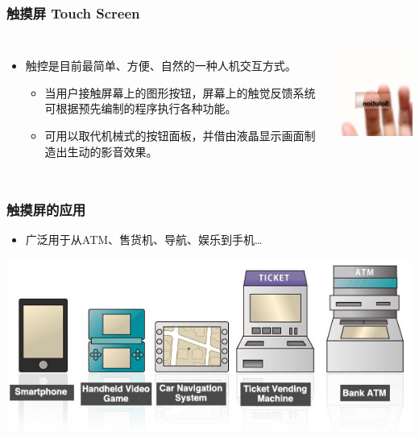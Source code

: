 \documentclass{beamer}
\begin{document}
\begin{frame}
	\frametitle{触摸屏 Touch Screen}
	\beamertemplatetransparentcovereddynamicmedium
	\begin{columns}
	\begin{itemize}[<+->]
		\item 触控是目前最简单、方便、自然的一种人机交互方式。
		\begin{itemize}
			\item 当用户接触屏幕上的图形按钮，屏幕上的触觉反馈系统可根据预先编制的程序执行各种功能。
			\item 可用以取代机械式的按钮面板，并借由液晶显示画面制造出生动的影音效果。
		\end{itemize}
	\end{itemize}
	\includegraphics[width=4cm]{images/touch-screen.jpg}
	\end{columns}
\end{frame}

\begin{frame}
	\frametitle{触摸屏的应用}
	\begin{itemize}
	\item 广泛用于从ATM、售货机、导航、娱乐到手机\dots
	\end{itemize}
	\includegraphics[width=\textwidth]{images/touch-screen-applications.jpg}
\end{frame}
\end{document}
